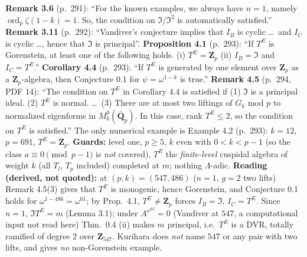 \begin{hypothesis}
  \textbf{Remark 3.6} (p.~291): ``For the known examples, we always have $n=1$, namely $\operatorname{ord}_p\zeta(1-k)=1$. So, the condition on
  $\mathfrak I/\mathfrak I^2$ is automatically satisfied.'' \textbf{Remark 3.11} (p.~292): ``Vandiver's conjecture implies that $I_B$ is cyclic
  \dots\ and $I_C$ is cyclic \dots, hence that $\mathfrak I$ is principal''. \textbf{Proposition 4.1} (p.~293): ``If $T^E$ is Gorenstein, at least one
  of the following holds. (i) $T^E=\mathbf Z_p$ (ii) $I_B=\mathfrak I$ and $I_C=T^E$.'' \textbf{Corollary 4.4} (p.~293): ``If $T^E$ is generated by one
  element over $\mathbf Z_p$ as a $\mathbf Z_p$-algebra, then Conjecture 0.1 for $\psi=\omega^{1-k}$ is true.'' \textbf{Remark 4.5} (p.~294, PDF 14):
  ``The condition on $T^E$ in Corollary 4.4 is satisfied if (1) $\mathfrak I$ is a principal ideal. (2) $T^E$ is normal. \dots\ (3) There are at most
  two liftings of $G_k$ mod $p$ to normalized eigenforms in $M^0_k(\bar{\mathbf Q}_p)$. In this case, rank $T^E\le2$, so the condition on $T^E$ is
  satisfied.'' The only numerical example is Example 4.2 (p.~293): $k=12$, $p=691$, $T^E=\mathbf Z_p$.
  \textbf{Guards:} level one, $p\ge5$, $k$ even with $0<k<p-1$ (so the class $a\equiv0\pmod{p-1}$ is \emph{not} covered), $T^E$ the
  \emph{finite-level} cuspidal algebra of weight $k$ (all $T_l$, $T_p$ included) completed at $m$; nothing $\Lambda$-adic.
  \textbf{Reading (derived, not quoted):} at $(p,k)=(547,486)$ ($n=1$, $g=2$ two lifts) Remark 4.5(3) gives that $T^E$ is monogenic, hence
  Gorenstein, and Conjecture 0.1 holds for $\omega^{1-486}=\omega^{61}$; by Prop.~4.1, $T^E\ne\mathbf Z_p$ forces $I_B=\mathfrak I$, $I_C=T^E$.
  Since $n=1$, $\mathfrak IT^E=m$ (Lemma 3.1); under $A^{\omega^{62}}=0$ (Vandiver at $547$, a computational input not read here)
  Thm.~0.4 (ii) makes $m$ principal, i.e.\ $T^E$ is a DVR, totally ramified of degree $2$ over $\mathbf Z_{547}$. Kurihara does \emph{not}
  name $547$ or any pair with two lifts, and gives \emph{no} non-Gorenstein example.
\end{hypothesis}
